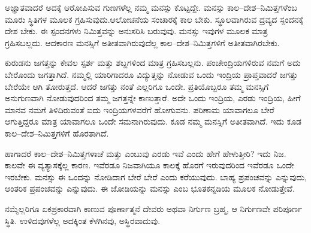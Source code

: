  ಅಜ್ಞಾತವಾದರೆ ಅದಕ್ಕೆ ಆರೋಪಿಸುವ ಗುಣಗಳೆಲ್ಲ ನಮ್ಮ ಮನಸ್ಸು ಕೊಟ್ಟದ್ದೇ. ಮನಸ್ಸು ಕಾಲ–ದೇಶ–ನಿಮಿತ್ತಗಳೆಂಬ ಮೂರು ಸ್ಥಿತಿಗಳ ಮೂಲಕ ಗ್ರಹಿಸುವುದು.\break ಆಲೋಚನೆಯ ಸಂಚಾರಕ್ಕೆ ಕಾಲ ಬೇಕು. ಸ್ಥೂಲವಾಗಿರುವ ದ್ರವ್ಯದ ಸ್ಪಂದನಕ್ಕೆ ದೇಶ ಬೇಕು. ಈ ಸ್ಪಂದನಗಳು ನಿಮಿತ್ತವನ್ನು ಅನುಸರಿಸಿ ಬರುವುವು. ಮನಸ್ಸು ಇವುಗಳ ಮೂಲಕ ಮಾತ್ರ ಗ್ರಹಿಸಬಲ್ಲದು. ಆದಕಾರಣ ಮನಸ್ಸಿಗೆ ಅತೀತವಾಗಿರುವುದೆಲ್ಲ ಕಾಲ–ದೇಶ–ನಿಮಿತ್ತಗಳಿಗೆ ಅತೀತವಾಗಿರಬೇಕು.

ಕುರುಡನು ಜಗತ್ತನ್ನು ಕೇವಲ ಸ್ಪರ್ಶ ಮತ್ತು ಶಬ್ದಗಳಿಂದ ಮಾತ್ರ ಗ್ರಹಿಸಬಲ್ಲನು. ಪಂಚೇಂದ್ರಿಯಗಳಿರುವ ನಮಗೆ ಅದು ಬೇರೊಂದು ಜಗತ್ತಾಗಿದೆ. ನಮ್ಮಲ್ಲಿ ಯಾರಿಗಾದರೂ ವಿದ್ಯುತ್ತನ್ನು ನೋಡುವ ಒಂದು ಇಂದ್ರಿಯ ಪ್ರಾಪ್ತವಾದರೆ ಜಗತ್ತು ಬೇರೆಯೇ ಆಗಿ ತೋರುತ್ತದೆ. ಆದರೆ ಜಗತ್ತು  ನಂತೆ ಎಲ್ಲರಿಗೂ ಒಂದೇ. ಪ್ರತಿಯೊಬ್ಬರೂ ತಮ್ಮ ಮನಸ್ಸಿಗೆ ಅನುಗುಣವಾಗಿ ನೋಡುವುದರಿಂದ ತಮ್ಮ ಜಗತ್ತನ್ನೇ ಕಾಣುತ್ತಾರೆ. ಅದೇ  ಒಂದು ಇಂದ್ರಿಯ,  ಎರಡು ಇಂದ್ರಿಯ, ಹೀಗೆ ಮಾನವ ನಮಗೆ ತಿಳಿದಿರುವಂತೆ ಐದು ಇಂದ್ರಿಯಗಳವರೆಗೆ ಹೋಗುವನು. ಪರಿಣಾಮ ಯಾವಾಗಲೂ ಬೇರೆ ಆಗುತ್ತಿದ್ದರೂ  ಮಾತ್ರ ಯಾವಾಗಲೂ ಒಂದೇ ಸಮನಾಗಿರುವುದು.  ಕೂಡ ನಮ್ಮ ಮನಸ್ಸಿಗೆ ಅತೀತವಾಗಿದೆ. ಇದು ಕೂಡ ಕಾಲ–ದೇಶ–ನಿಮಿತ್ತಗಳಿಗೆ ಹೊರತಾಗಿದೆ.

ಹಾಗಾದರೆ ಕಾಲ–ದೇಶ–ನಿಮಿತ್ತಗಳಾಚೆ  ಮತ್ತು  ಎಂಬುವು ಎರಡು ಇವೆ ಎಂದು ಹೇಗೆ ಹೇಳುತ್ತೀರಿ? ಇದು ನಿಜ. ಕಾಲವೇ ಈ ವ್ಯತ್ಯಾಸಕ್ಕೆಲ್ಲ ಕಾರಣ. ಇವೆರಡೂ ನಿಜವಾಗಿಯೂ ಕಾಲಕ್ಕೆ ಹೊರಗೆ ಇರುವುದರಿಂದ ಇವೆರಡೂ ಒಂದೇ ಇರಬೇಕು. ಮನಸ್ಸು ಈ ಒಂದನ್ನು ನೋಡಿದಾಗ ಬೇರೆ ಬೇರೆ ಎಂದು ಕರೆಯುವುದು. ಬಾಹ್ಯ ಪ್ರಪಂಚವನ್ನು  ಎನ್ನುವುದು, ಆಂತರಿಕ ಪ್ರಪಂಚವನ್ನು  ಎನ್ನುವುದು. ಈ ಜೋಡಿಯನ್ನು ಮನಸ್ಸು ಎಂಬ ಭೂತಕನ್ನಡಿಯ ಮೂಲಕ ನೋಡುತ್ತೇವೆ.

ನಮ್ಮೆಲ್ಲರಿಗೂ ಏಕಪ್ರಕಾರವಾಗಿ ಕಾಣುವ ಪೂರ್ಣಾತ್ಮನೆ ದೇವರು ಅಥವಾ ನಿರ್ಗುಣ ಬ್ರಹ್ಮ, ಆ ನಿರ್ಗುಣವೇ ಪರಿಪೂರ್ಣ ಸ್ಥಿತಿ. ಉಳಿದವುಗಳೆಲ್ಲ ಅದಕ್ಕಿಂತ ಕೆಳಗಿನವು, ಅಸ್ಥಿರವಾದುವು.

